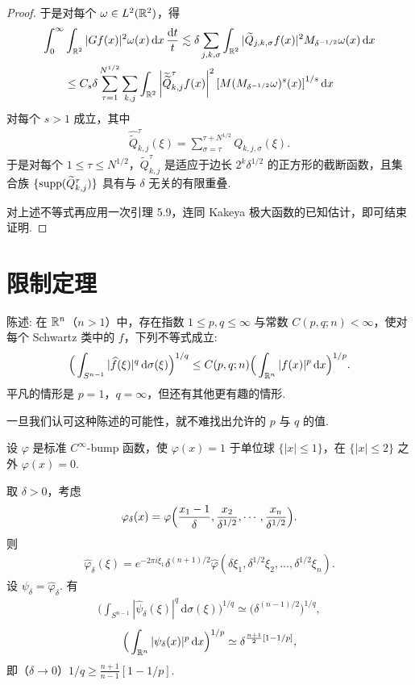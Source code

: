 \begin{proof}
于是对每个 $\omega \in L^2(\mathbb{R}^2)$，得
\begin{align*}
  \int_{0}^{\infty}&\int_{\mathbb{R}^{2}}|G f(x)|^{2}\omega(x)\,\mathrm{d}x\,\frac{\mathrm{d}t}{t}
  \lesssim\delta\sum_{j,k,\sigma}\int_{\mathbb{R}^{2}}|\widetilde{Q}_{j,k,\sigma}f(x)|^{2}M_{\delta^{-1/2}}\omega(x)\,\mathrm{d}x\\
  &\leq C_{s}\delta\sum_{\tau=1}^{N^{1/2}}\sum_{k,j}\int_{\mathbb{R}^{2}}
  \left|\widetilde{\widetilde{Q}}_{k,j}^{\tau}f(x)\right|^{2}\left[M(M_{\delta^{-1/2}}\omega)^{s}(x)\right]^{1/s}\mathrm{d}x
\end{align*}
对每个 $s > 1$ 成立，其中
\begin{align*}
  \widehat{\widetilde{Q}}_{k,j}^{\tau}(\xi)=\sum_{\sigma=\tau}^{\tau+N^{1/2}}Q_{k,j,\sigma}(\xi).
\end{align*}
于是对每个 $1 \leq \tau \leq N^{1/2}$，$\widetilde{Q}_{k,j}^{\tau}$ 是适应于边长 $2^k\delta^{1/2}$ 的正方形的截断函数，且集合族 $\{\operatorname{supp}(\widetilde{Q}_{k,j}^{\tau})\}$ 具有与 $\delta$ 无关的有限重叠.

对上述不等式再应用一次引理 5.9，连同 Kakeya 极大函数的已知估计，即可结束证明.
\end{proof}

\section{限制定理}

陈述: 在 $\mathbb{R}^n$（$n > 1$）中，存在指数 $1 \leq p, q \leq \infty$ 与常数 $C(p, q; n) < \infty$，使对每个 Schwartz 类中的 $f$，下列不等式成立:
\begin{align*}
  \Big(\int_{S^{n-1}}|\widehat{f}(\xi)|^{q}\,\mathrm{d}\sigma(\xi)\Big)^{1/q}
  \leq C(p,q;n)\Big(\int_{\mathbb{R}^{n}}|f(x)|^{p}\,\mathrm{d}x\Big)^{1/p}.
\end{align*}
平凡的情形是 $p = 1$，$q = \infty$，但还有其他更有趣的情形.

一旦我们认可这种陈述的可能性，就不难找出允许的 $p$ 与 $q$ 的值.

设 $\varphi$ 是标准 $C^\infty$-bump 函数，使 $\varphi(x) = 1$ 于单位球 $\{|x| \leq 1\}$，在 $\{|x| \leq 2\}$ 之外 $\varphi(x) = 0$.

取 $\delta > 0$，考虑
\begin{align*}
  \varphi_{\delta}(x)=\varphi\Bigl(\frac{x_{1}-1}{\delta},\frac{x_{2}}{\delta^{1/2}},\cdots,\frac{x_{n}}{\delta^{1/2}}\Bigr).
\end{align*}
则
\begin{align*}
  \widehat{\varphi}_{\delta}(\xi)=e^{-2\pi i\xi_{1}}\delta^{(n+1)/2}\widehat{\varphi}(\delta\xi_{1},\delta^{1/2}\xi_{2},\ldots,\delta^{1/2}\xi_{n}).
\end{align*}
设 $\psi_{\delta} = \widehat{\varphi}_{\delta}$. 有
\begin{align*}
  \Big(\int_{S^{n-1}}|\widehat{\psi}_{\delta}(\xi)|^{q}\,\mathrm{d}\sigma(\xi)\Big)^{1/q}\simeq\big(\delta^{(n-1)/2}\big)^{1/q},
\end{align*}
\begin{align*}
  \Big(\int_{\mathbb{R}^{n}}|\psi_{\delta}(x)|^{p}\,\mathrm{d}x\Big)^{1/p}\simeq\delta^{\frac{n+1}{2}[1-1/p]},
\end{align*}
即（$\delta \to 0$）$1/q \geq \frac{n+1}{n-1}[1 - 1/p]$.

